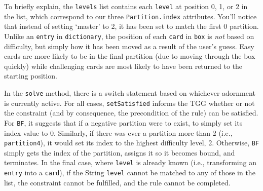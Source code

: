 To briefly explain, the \texttt{levels} list contains each \texttt{level} at position 0, 1, or 2 in the list, which correspond to our three
\texttt{Partition.index} attributes. You'll notice that instead of setting `master' to 2, it has been set to match the first 0 partition. Unlike an
\texttt{entry} in \texttt{dictionary}, the position of each \texttt{card} in \texttt{box} is \emph{not} based on difficulty, but simply how it has been moved
as a result of the user's guess. Easy cards are more likely to be in the final partition (due to moving through the box quickly) while challenging cards are
most likely to have been returned to the starting position.

In the \texttt{solve} method, there is a switch statement based on whichever adornment is currently active. For all cases, \texttt{setSatisfied}
informs the TGG whether or not the constraint (and by consequence, the precondition of the rule) can be satisfied. For \texttt{BF}, it suggests that if a
negative partition were to exist, to simply set its index value to 0. Similarly, if there was ever a partition more than 2 (i.e., \texttt{partition4}), it
would set its index to the highest difficulty level, 2. Otherwise, \texttt{BF} simply gets the index of the partition, assigns it so it becomes bound, and
terminates. In the final case, where \texttt{level} is already known (i.e., transforming an \texttt{entry} into a \texttt{card}), if the String \texttt{level}
cannot be matched to any of those in the list, the constraint cannot be fulfilled, and the rule cannot be completed.
